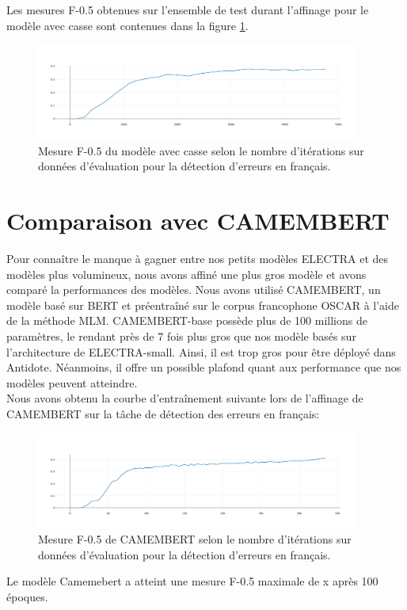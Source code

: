 \documentclass[12pt,twoside,maitrise]{dms}
\theoremstyle{definition}
\numberwithin{equation}{section}
\numberwithin{table}{chapter}
\numberwithin{figure}{chapter}
\begin{document}
Les mesures F-0.5 obtenues sur l'ensemble de test durant
l'affinage pour le modèle avec casse sont contenues dans la figure
\ref{fig:f05electraaveccasse}.
\begin{figure}
    \begin{center}
        \includegraphics[width=0.95\textwidth]{figures/electraaveccassef05.png}
    \end{center}
    \caption{Mesure F-0.5 du modèle avec casse selon le nombre d'itérations sur
    données d'évaluation pour la détection d'erreurs en
    français.}\label{fig:f05electraaveccasse}
\end{figure}


\section{Comparaison avec CAMEMBERT}
Pour connaître le manque à gagner entre nos petits modèles ELECTRA et des
modèles plus volumineux, nous avons affiné une plus gros modèle et avons
comparé la performances des modèles. Nous avons utilisé CAMEMBERT, un modèle
basé sur BERT et préentraîné sur le corpus francophone OSCAR à l'aide de la
méthode MLM. CAMEMBERT-base possède plus de 100 millions de paramètres, le rendant
près de 7 fois plus gros que nos modèle basés sur l'architecture de
ELECTRA-small. Ainsi, il est trop gros pour être déployé dans Antidote.
Néanmoins, il offre un possible plafond quant aux performance que nos modèles
peuvent atteindre. \\

Nous avons obtenu la courbe d'entraînement suivante lors de l'affinage de
CAMEMBERT sur la tâche de détection des erreurs en français:
\begin{figure}
    \begin{center}
        \includegraphics[width=0.95\textwidth]{figures/camembertbasef05100epoquesnat.png}
    \end{center}
    \caption{Mesure F-0.5 de CAMEMBERT selon le nombre d'itérations sur
    données d'évaluation pour la détection d'erreurs en
    français.}\label{fig:f05camembert}
\end{figure}
Le modèle Camemebert a atteint une mesure F-0.5 maximale de x %
après 100 époques.
\end{document}
